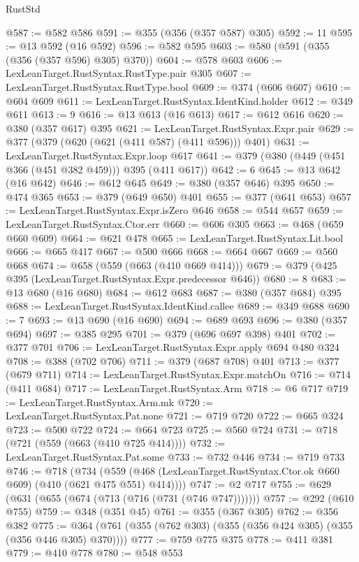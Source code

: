 \begin{lexlean}{RustStd}
\begin{coremodule}
@587 := @582 @586
@591 := @355 (@356 (@357 @587) @305)
@592 := 11
@595 := @13 @592 (@16 @592)
@596 := @582 @595
@603 := @580 (@591 (@355 (@356 (@357 @596) @305) @370))
@604 := @578 @603
@606 := LexLeanTarget.RustSyntax.RustType.pair @305
@607 := LexLeanTarget.RustSyntax.RustType.bool
@609 := @374 (@606 @607)
@610 := @604 @609
@611 := LexLeanTarget.RustSyntax.IdentKind.holder
@612 := @349 @611
@613 := 9
@616 := @13 @613 (@16 @613)
@617 := @612 @616
@620 := @380 (@357 @617) @395
@621 := LexLeanTarget.RustSyntax.Expr.pair
@629 := @377 (@379 (@620 (@621 (@411 @587) (@411 @596))) @401)
@631 := LexLeanTarget.RustSyntax.Expr.loop @617
@641 := @379 (@380 (@449 (@451 @366 (@451 @382 @459))) @395 (@411 @617))
@642 := 6
@645 := @13 @642 (@16 @642)
@646 := @612 @645
@649 := @380 (@357 @646) @395
@650 := @474 @365
@653 := @379 (@649 @650) @401
@655 := @377 (@641 @653)
@657 := LexLeanTarget.RustSyntax.Expr.isZero @646
@658 := @544 @657
@659 := LexLeanTarget.RustSyntax.Ctor.err
@660 := @606 @305
@663 := @468 (@659 @660 @609)
@664 := @621 @478
@665 := LexLeanTarget.RustSyntax.Lit.bool
@666 := @665 @417
@667 := @500 @666
@668 := @664 @667
@669 := @560 @668
@674 := @658 (@559 (@663 (@410 @669 @414)))
@679 := @379 (@425 @395 (LexLeanTarget.RustSyntax.Expr.predecessor @646))
@680 := 8
@683 := @13 @680 (@16 @680)
@684 := @612 @683
@687 := @380 (@357 @684) @395
@688 := LexLeanTarget.RustSyntax.IdentKind.callee
@689 := @349 @688
@690 := 7
@693 := @13 @690 (@16 @690)
@694 := @689 @693
@696 := @380 (@357 @694)
@697 := @385 @295
@701 := @379 (@696 @697 @398) @401
@702 := @377 @701
@706 := LexLeanTarget.RustSyntax.Expr.apply @694 @480 @324
@708 := @388 (@702 @706)
@711 := @379 (@687 @708) @401
@713 := @377 (@679 @711)
@714 := LexLeanTarget.RustSyntax.Expr.matchOn
@716 := @714 (@411 @684)
@717 := LexLeanTarget.RustSyntax.Arm
@718 := @6 @717
@719 := LexLeanTarget.RustSyntax.Arm.mk
@720 := LexLeanTarget.RustSyntax.Pat.none
@721 := @719 @720
@722 := @665 @324
@723 := @500 @722
@724 := @664 @723
@725 := @560 @724
@731 := @718 (@721 (@559 (@663 (@410 @725 @414))))
@732 := LexLeanTarget.RustSyntax.Pat.some
@733 := @732 @446
@734 := @719 @733
@746 := @718
    (@734 (@559 (@468 (LexLeanTarget.RustSyntax.Ctor.ok @660 @609) (@410 (@621 @475 @551) @414))))
@747 := @2 @717
@755 := @629 (@631 (@655 (@674 (@713 (@716 (@731 (@746 @747)))))))
@757 := @292 (@610 @755)
@759 := @348 (@351 @45)
@761 := @355 (@367 @305)
@762 := @356 @382
@775 := @364 (@761 (@355 (@762 @303) (@355 (@356 @424 @305) (@355 (@356 @446 @305) @370))))
@777 := @759 @775 @375
@778 := @411 @381
@779 := @410 @778
@780 := @548 @553

\end{coremodule}
\end{lexlean}
